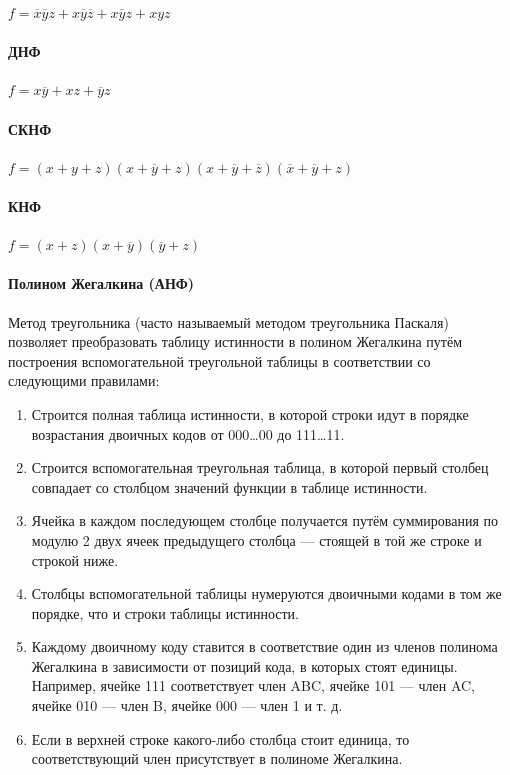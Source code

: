 \documentclass{article}
\begin{document}
$f = \overline{x} \overline{y} z + x \overline{y} \overline{z} + x \overline{y} z + x y z$

\paragraph{ДНФ}

$f = x \overline{y} + x z + \overline{y} z$

\paragraph{СКНФ}

$f = (x + y + z)(x + \overline{y} + z)(x + \overline{y} + \overline{z})(\overline{x} + \overline{y} + z)$

\paragraph{КНФ} $f = (x + z)(x + \overline{y})(\overline{y} + z)$

\paragraph{Полином Жегалкина (АНФ)} Метод треугольника (часто называемый методом треугольника Паскаля) позволяет преобразовать таблицу истинности в полином Жегалкина путём построения вспомогательной треугольной таблицы в соответствии со следующими правилами:

\begin{enumerate}
    \item Строится полная таблица истинности, в которой строки идут в порядке возрастания двоичных кодов от 000…00 до 111…11.
    \item Строится вспомогательная треугольная таблица, в которой первый столбец совпадает со столбцом значений функции в таблице истинности.
    \item Ячейка в каждом последующем столбце получается путём суммирования по модулю 2 двух ячеек предыдущего столбца — стоящей в той же строке и строкой ниже.
    \item Столбцы вспомогательной таблицы нумеруются двоичными кодами в том же порядке, что и строки таблицы истинности.
    \item Каждому двоичному коду ставится в соответствие один из членов полинома Жегалкина в зависимости от позиций кода, в которых стоят единицы. Например, ячейке 111 соответствует член ABC, ячейке 101 — член AC, ячейке 010 — член B, ячейке 000 — член 1 и т. д.
    \item Если в верхней строке какого-либо столбца стоит единица, то соответствующий член присутствует в полиноме Жегалкина.
\end{enumerate}
\end{document}
